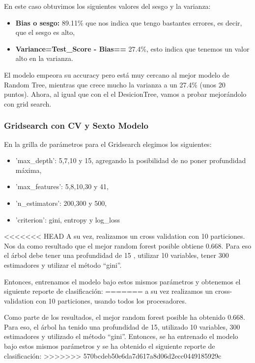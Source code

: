 \documentclass[a4paper]{article}
\begin{document}
\begin{itemize}
            En este caso  obtuvimos los siguientes valores del sesgo y la varianza:
            \begin{itemize}
                \item \textbf{Bias o sesgo:} 89.11\% que nos indica que tengo bastantes errores, es decir, que el sesgo es alto,
                \item \textbf{Variance=Test\_Score - Bias==} 27.4\%, esto indica que tenemos un valor alto en la varianza.
             \end{itemize}

            El modelo empeora su accuracy pero está muy cercano al mejor modelo de Random Tree, mientras que crece mucho la varianza a un 27.4\% (unos 20 puntos). Ahora, al igual que con el el DesicionTree, vamos a probar mejorándolo con grid search.

        \subsubsection{Gridsearch con CV y Sexto Modelo}

            En la grilla de parámetros para el Gridsearch elegimos los siguientes:
            \begin{itemize}
                \item 'max\_depth': 5,7,10 y 15, agregando la posibilidad de no poner profundidad máxima,
                \item 'max\_features': 5,8,10,30 y 41,
                \item 'n\_estimators': 200,300 y 500,
                \item 'criterion': gini, entropy y log\_loss
            \end{itemize}
<<<<<<< HEAD
            A su vez, realizamos un cross validation con 10 particiones. Nos da como resultado que el mejor random forest posible obtiene 0.668. Para eso el árbol debe tener una profundidad de 15 , utilizar  10  variables, tener  300  estimadores y utilizar el método ``gini''.
            
            Entonces, entrenamos el modelo bajo estos mismos parámetros y obtenemos el siguiente reporte de clasificación:
=======
            a su vez realizamos un cross-validation con 10 particiones, usando todos los procesadores.

           Como parte de los resultados, el mejor random forest posible ha obtenido 0.668. Para eso, el árbol ha tenido una profundidad de 15, utilizado  10  variables,  300  estimadores y utilizado el método ``gini''. Entonces, se ha entrenado el modelo bajo estos mismos parámetros y se ha obtenido el siguiente reporte de clasificación:
>>>>>>> 570bcdeb50e6da7d617a8d06d2ecc0449185929c


\end{itemize}
\end{document}
